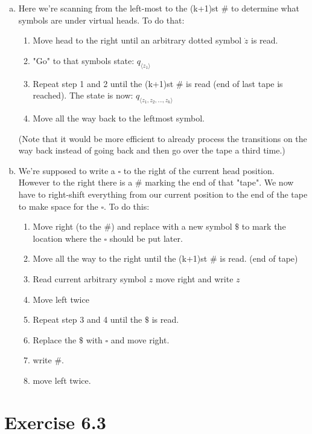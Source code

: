 \documentclass{article} %
\newcommand{\homeworkNumber}{6}
\begin{document}
\begin{enumerate}[(a)]
\item
Here we're scanning from the left-most to the (k+1)st $\#$ to determine what symbols are under virtual heads. To do that:
\begin{enumerate}[1.]
\item Move head to the right until an arbitrary dotted symbol $\dot{z}$ is read.
\item "Go" to that symbols state: $q_{\langle z_1 \rangle}$
\item Repeat step 1 and 2 until the (k+1)st $\#$ is read (end of last tape is reached). The state is now: $q_{\langle z_1, z_2, \dots, z_k \rangle}$
\item Move all the way back to the leftmost symbol.
\end{enumerate}
(Note that it would be more efficient to already process the transitions on the way back instead of going back and then go over the tape a third time.)
\clearpage
\item
We're supposed to write a $\square$ to the right of the current head position. However to the right there is a $\#$ marking the end of that "tape". We now have to right-shift everything from our current position to the end of the tape to make space for the $\square$. To do this:
\begin{enumerate}[1.]
\item Move right (to the $\#$) and replace with a new symbol $\$$ to mark the location where the $\square$ should be put later.
\item Move all the way to the right until the (k+1)st $\#$ is read. (end of tape)
\item Read current arbitrary symbol $z$ move right and write $z$
\item Move left twice
\item Repeat step 3 and 4 until the $\$$ is read.
\item Replace the $\$$ with $\square$ and move right.
\item write $\#$.
\item move left twice.
\end{enumerate}

\end{enumerate}


\section*{Exercise \homeworkNumber.3}
\end{document}
